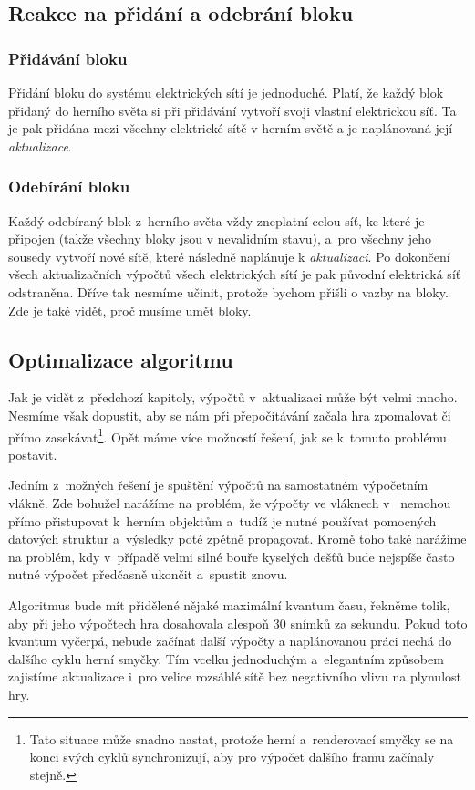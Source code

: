 \subsection{Reakce na přidání a odebrání bloku}
\label{subsec:reac}
\subsubsection{Přidávání bloku}
Přidání bloku do systému elektrických sítí je jednoduché. Platí, že každý blok přidaný do herního světa si při přidávání vytvoří svoji vlastní elektrickou síť. Ta je pak přidána mezi všechny elektrické sítě v herním světě a je naplánovaná její \textit{aktualizace}. 

\subsubsection{Odebírání bloku}
Každý odebíraný blok z~herního světa vždy zneplatní celou síť, ke které je připojen (takže všechny bloky jsou v nevalidním stavu), a~pro všechny jeho sousedy vytvoří nové sítě, které následně naplánuje k \textit{aktualizaci}. Po dokončení všech aktualizačních výpočtů všech elektrických sítí je pak původní elektrická síť odstraněna. Dříve tak nesmíme učinit, protože bychom přišli o vazby na bloky. Zde je také vidět, proč musíme umět  bloky.

\subsection{Optimalizace algoritmu}

Jak je vidět z~předchozí kapitoly, výpočtů v~aktualizaci může být velmi mnoho. Nesmíme však dopustit, aby se nám při přepočítávání začala hra zpomalovat či přímo zasekávat\footnote{Tato situace může snadno nastat, protože herní a~renderovací smyčky se na konci svých cyklů synchronizují, aby pro výpočet dalšího framu začínaly stejně.}. Opět máme více možností řešení, jak se k~tomuto problému postavit. 

Jedním z~možných řešení je spuštění výpočtů na samostatném výpočetním vlákně. Zde bohužel narážíme na problém, že výpočty ve vláknech v~\UEu{} nemohou přímo přistupovat k~herním objektům a~tudíž je nutné používat pomocných datových struktur a~výsledky poté zpětně propagovat. Kromě toho také narážíme na problém, kdy v~případě velmi silné bouře kyselých dešťů bude nejspíše často nutné výpočet předčasně ukončit a~spustit znovu.

Algoritmus bude mít přidělené nějaké maximální kvantum času, řekněme tolik, aby při jeho výpočtech hra dosahovala alespoň 30 snímků za sekundu. Pokud toto kvantum vyčerpá, nebude začínat další výpočty a naplánovanou práci nechá do dalšího cyklu herní smyčky. Tím vcelku jednoduchým a~elegantním způsobem zajistíme aktualizace i~pro velice rozsáhlé sítě bez negativního vlivu na plynulost hry.








